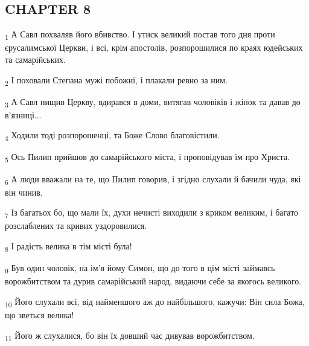 \subsection{CHAPTER 8}
\begin{tcolorbox}
\textsubscript{1} А Савл похваляв його вбивство. І утиск великий постав того дня проти єрусалимської Церкви, і всі, крім апостолів, розпорошилися по краях юдейських та самарійських.
\end{tcolorbox}
\begin{tcolorbox}
\textsubscript{2} І поховали Степана мужі побожні, і плакали ревно за ним.
\end{tcolorbox}
\begin{tcolorbox}
\textsubscript{3} А Савл нищив Церкву, вдирався в доми, витягав чоловіків і жінок та давав до в'язниці...
\end{tcolorbox}
\begin{tcolorbox}
\textsubscript{4} Ходили тоді розпорошенці, та Боже Слово благовістили.
\end{tcolorbox}
\begin{tcolorbox}
\textsubscript{5} Ось Пилип прийшов до самарійського міста, і проповідував їм про Христа.
\end{tcolorbox}
\begin{tcolorbox}
\textsubscript{6} А люди вважали на те, що Пилип говорив, і згідно слухали й бачили чуда, які він чинив.
\end{tcolorbox}
\begin{tcolorbox}
\textsubscript{7} Із багатьох бо, що мали їх, духи нечисті виходили з криком великим, і багато розслаблених та кривих уздоровилися.
\end{tcolorbox}
\begin{tcolorbox}
\textsubscript{8} І радість велика в тім місті була!
\end{tcolorbox}
\begin{tcolorbox}
\textsubscript{9} Був один чоловік, на ім'я йому Симон, що до того в цім місті займавсь ворожбитством та дурив самарійський народ, видаючи себе за якогось великого.
\end{tcolorbox}
\begin{tcolorbox}
\textsubscript{10} Його слухали всі, від найменшого аж до найбільшого, кажучи: Він сила Божа, що зветься велика!
\end{tcolorbox}
\begin{tcolorbox}
\textsubscript{11} Його ж слухалися, бо він їх довший час дивував ворожбитством.
\end{tcolorbox}
